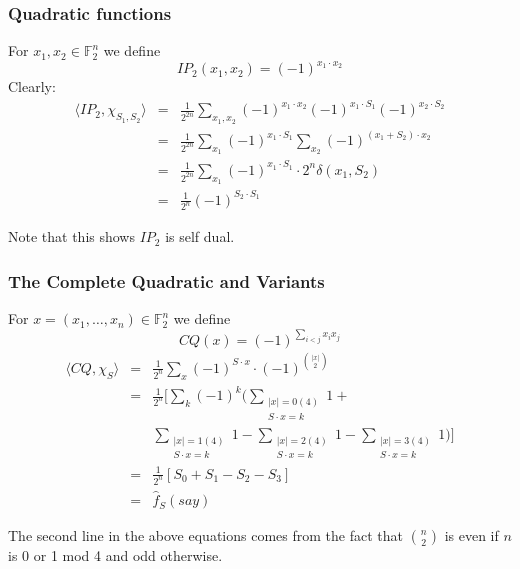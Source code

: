 \documentclass{sig-alternate}
\begin{document}
\subsubsection{Quadratic functions}
\noindent For $x_1, x_2 \in \mathbb{F}^n_2$ we define \[IP_2(x_1, x_2) = (-1)^{x_1\cdot x_2}\]
Clearly:
\begin{eqnarray*}
\langle IP_2, \chi_{S_1, S_2}\rangle & = & \frac{1}{2^{2n}}\sum_{x_1, x_2} (-1)^{x_1\cdot x_2}(-1)^{x_1\cdot S_1}(-1)^{x_2\cdot S_2} \\
& = & \frac{1}{2^{2n}} \sum_{x_1}(-1)^{x_1\cdot S_1} \sum_{x_2}(-1)^{(x_1+S_2)\cdot x_2} \\
& = &  \frac{1}{2^{2n}} \sum_{x_1}(-1)^{x_1\cdot S_1}\cdot 2^n\delta(x_1,S_2) \\
& = &  \frac{1}{2^n} (-1)^{S_2\cdot S_1}
\end{eqnarray*}

Note that this shows $IP_2$ is self dual. \\

\subsubsection{The Complete Quadratic and Variants}

For $x = (x_1,\ldots, x_n) \in \mathbb{F}^n_2$ we define \[CQ(x) = (-1)^{\sum_{i<j}x_ix_j}\]
\begin{eqnarray*}
\langle CQ, \chi_S\rangle & = & \frac{1}{2^n}\sum_x (-1)^{S\cdot x}\cdot (-1)^{|x| \choose 2} \\
& = & \frac{1}{2^n}\big[\sum_{k}(-1)^k\big(\sum_{\substack{|x| = 0(4)\\S\cdot x = k}}1 + \\
& &	\sum_{\substack{|x|=1(4)\\S\cdot x = k}}1 - \sum_{\substack{|x|=2(4)\\S\cdot x = k}}1 -\sum_{\substack{|x|=3(4)\\S\cdot x = k}}1\big)\big] \\
& = & \frac{1}{2^n}[S_0 + S_1 - S_2 -S_3] \\
& = & \hat{f}_S (say)
\end{eqnarray*}

\noindent The second line in the above equations comes from the fact that ${n \choose 2}$ is even if $n$ is 0 or 1 mod 4 and odd otherwise.\\
\end{document}
